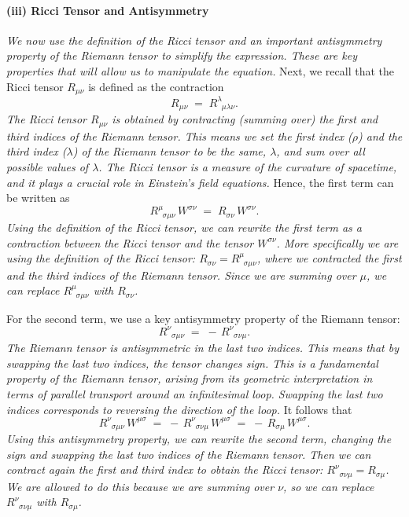 \documentclass{article}
\begin{document}
\paragraph{(iii) Ricci Tensor and Antisymmetry}
\textit{We now use the definition of the Ricci tensor and an important antisymmetry property of the Riemann tensor to simplify the expression. These are key properties that will allow us to manipulate the equation.}
Next, we recall that the Ricci tensor $R_{\mu\nu}$ is defined as the contraction
\[
R_{\mu\nu} \;=\; R^\lambda_{\;\;\mu\lambda\nu}.
\]
\textit{The Ricci tensor \(R_{\mu\nu}\) is obtained by contracting (summing over) the first and third indices of the Riemann tensor. This means we set the first index (\(\rho\)) and the third index (\(\lambda\)) of the Riemann tensor to be the same, \(\lambda\), and sum over all possible values of \(\lambda\). The Ricci tensor is a measure of the curvature of spacetime, and it plays a crucial role in Einstein's field equations.}
Hence, the first term can be written as 
\[
R^\mu_{\;\;\sigma\mu\nu}\,W^{\sigma\nu}
\;=\;
R_{\sigma\nu}\,W^{\sigma\nu}.
\]
\textit{Using the definition of the Ricci tensor, we can rewrite the first term as a contraction between the Ricci tensor and the tensor \(W^{\sigma\nu}\). More specifically we are using the definition of the Ricci tensor: \(R_{\sigma\nu} = R^\mu_{\;\;\sigma\mu\nu}\), where we contracted the first and the third indices of the Riemann tensor. Since we are summing over \(\mu\), we can replace \(R^\mu_{\;\;\sigma\mu\nu}\) with \(R_{\sigma\nu}\).}

For the second term, we use a key antisymmetry property of the Riemann tensor:
\[
R^\nu_{\;\;\sigma\mu\nu}
\;=\;
-\,R^\nu_{\;\;\sigma\nu\mu}.
\]
\textit{The Riemann tensor is antisymmetric in the last two indices. This means that by swapping the last two indices, the tensor changes sign. This is a fundamental property of the Riemann tensor, arising from its geometric interpretation in terms of parallel transport around an infinitesimal loop. Swapping the last two indices corresponds to reversing the direction of the loop.}
It follows that
\[
R^\nu_{\;\;\sigma\mu\nu}\,W^{\mu\sigma}
\;=\;
-\,R^\nu_{\;\;\sigma\nu\mu}\,W^{\mu\sigma}
\;=\;
-\,R_{\sigma\mu}\,W^{\mu\sigma}.
\]
\textit{Using this antisymmetry property, we can rewrite the second term, changing the sign and swapping the last two indices of the Riemann tensor. Then we can contract again the first and third index to obtain the Ricci tensor: \(R^\nu_{\;\;\sigma\nu\mu} = R_{\sigma\mu}\). We are allowed to do this because we are summing over \(\nu\), so we can replace \(R^\nu_{\;\;\sigma\nu\mu}\) with \(R_{\sigma\mu}\).}
\end{document}
